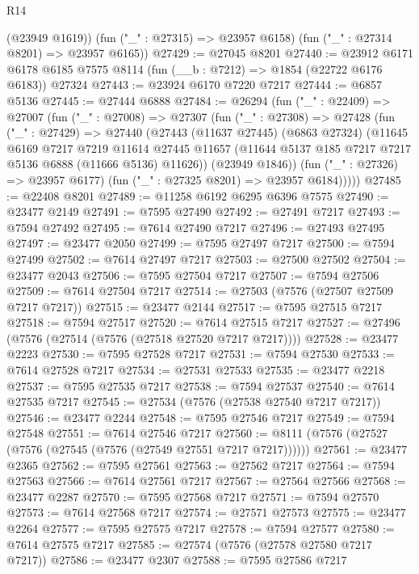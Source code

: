 \begin{lexlean}{R14}
\begin{coremodule}
        (@23949 @1619))
      (fun ("_" : @27315) => @23957 @6158)
      (fun ("_" : @27314 @8201) => @23957 @6165))
@27429 := @27045 @8201
@27440 := @23912
    @6171
    @6178
    @6185
    @7575
    @8114
    (fun (__b : @7212) => @1854 (@22722 @6176 @6183))
    @27324
@27443 := @23924 @6170 @7220 @7217
@27444 := @6857 @5136
@27445 := @27444 @6888
@27484 := @26294
    (fun ("_" : @22409) =>
    @27007
      (fun ("_" : @27008) =>
      @27307
        (fun ("_" : @27308) =>
        @27428
          (fun ("_" : @27429) =>
          @27440
            (@27443
              (@11637 @27445)
              (@6863 @27324)
              (@11645
                @6169
                @7217
                @7219
                @11614
                @27445
                @11657
                (@11644 @5137 @185 @7217 @7217 @5136 @6888 (@11666 @5136) @11626))
              (@23949 @1846))
            (fun ("_" : @27326) => @23957 @6177)
            (fun ("_" : @27325 @8201) => @23957 @6184)))))
@27485 := @22408 @8201
@27489 := @11258 @6192 @6295 @6396 @7575
@27490 := @23477 @2149
@27491 := @7595 @27490
@27492 := @27491 @7217
@27493 := @7594 @27492
@27495 := @7614 @27490 @7217
@27496 := @27493 @27495
@27497 := @23477 @2050
@27499 := @7595 @27497 @7217
@27500 := @7594 @27499
@27502 := @7614 @27497 @7217
@27503 := @27500 @27502
@27504 := @23477 @2043
@27506 := @7595 @27504 @7217
@27507 := @7594 @27506
@27509 := @7614 @27504 @7217
@27514 := @27503 (@7576 (@27507 @27509 @7217 @7217))
@27515 := @23477 @2144
@27517 := @7595 @27515 @7217
@27518 := @7594 @27517
@27520 := @7614 @27515 @7217
@27527 := @27496 (@7576 (@27514 (@7576 (@27518 @27520 @7217 @7217))))
@27528 := @23477 @2223
@27530 := @7595 @27528 @7217
@27531 := @7594 @27530
@27533 := @7614 @27528 @7217
@27534 := @27531 @27533
@27535 := @23477 @2218
@27537 := @7595 @27535 @7217
@27538 := @7594 @27537
@27540 := @7614 @27535 @7217
@27545 := @27534 (@7576 (@27538 @27540 @7217 @7217))
@27546 := @23477 @2244
@27548 := @7595 @27546 @7217
@27549 := @7594 @27548
@27551 := @7614 @27546 @7217
@27560 := @8111 (@7576 (@27527 (@7576 (@27545 (@7576 (@27549 @27551 @7217 @7217))))))
@27561 := @23477 @2365
@27562 := @7595 @27561
@27563 := @27562 @7217
@27564 := @7594 @27563
@27566 := @7614 @27561 @7217
@27567 := @27564 @27566
@27568 := @23477 @2287
@27570 := @7595 @27568 @7217
@27571 := @7594 @27570
@27573 := @7614 @27568 @7217
@27574 := @27571 @27573
@27575 := @23477 @2264
@27577 := @7595 @27575 @7217
@27578 := @7594 @27577
@27580 := @7614 @27575 @7217
@27585 := @27574 (@7576 (@27578 @27580 @7217 @7217))
@27586 := @23477 @2307
@27588 := @7595 @27586 @7217

\end{coremodule}
\end{lexlean}
